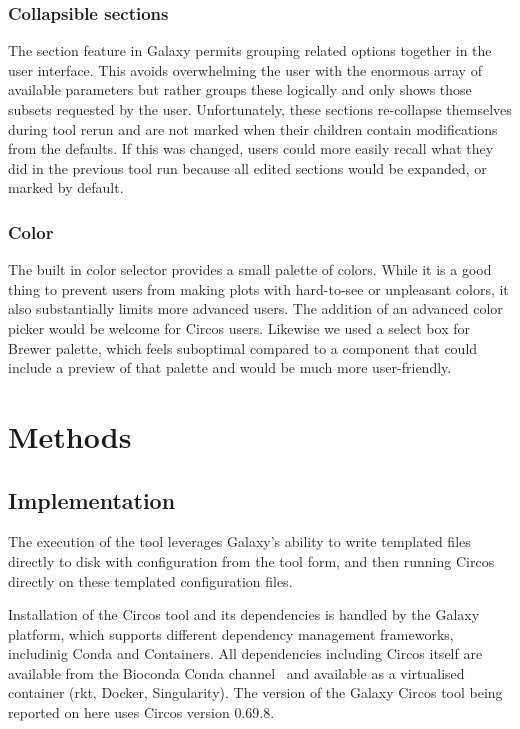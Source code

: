 \subsubsection*{Collapsible sections}

The section feature in Galaxy permits grouping related options together in the user interface. This avoids overwhelming the user with the enormous array of available parameters but rather groups these logically and only shows those subsets requested by the user. Unfortunately, these sections re-collapse themselves during tool rerun and are not marked when their children contain modifications from the defaults. If this was changed, users could more easily recall what they did in the previous tool run because all edited sections would be expanded, or marked by default.

\subsubsection*{Color}

The built in color selector provides a small palette of colors. While it is a good thing to prevent users from making plots with hard-to-see or unpleasant colors, it also substantially limits more advanced users. The addition of an advanced color picker would be welcome for Circos users. Likewise we used a select box for Brewer palette, which feels suboptimal compared to a component that could include a preview of that palette and would be much more user-friendly.


\section*{Methods}

\subsection*{Implementation}
The execution of the tool leverages Galaxy's ability to write templated files directly to disk with configuration from the tool form, and then running Circos directly on these templated configuration files.

Installation of the Circos tool and its dependencies is handled by the Galaxy platform, which supports different dependency management frameworks, includinig Conda and Containers. All dependencies including Circos itself are available from the Bioconda Conda channel~\cite{gruning2018bioconda} and available as a virtualised container (rkt, Docker, Singularity). The version of the Galaxy Circos tool being reported on here uses Circos version 0.69.8.

